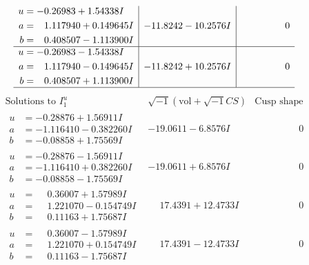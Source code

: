 \documentclass[1p]{elsarticle_modified}
\theoremstyle{definition}
\newcommand{\I}{\sqrt{-1}}
\begin{document}
$$\begin{array}{c|c|c}
\begin{aligned}
u &= -0.26983 + 1.54338 I \\
a &= \phantom{-}1.117940 + 0.149645 I \\
b &= \phantom{-}0.408507 - 1.113900 I\end{aligned}
 & -11.8242 - 10.2576 I & \phantom{-0.000000 } 0 \\ \hline\begin{aligned}
u &= -0.26983 - 1.54338 I \\
a &= \phantom{-}1.117940 - 0.149645 I \\
b &= \phantom{-}0.408507 + 1.113900 I\end{aligned}
 & -11.8242 + 10.2576 I & \phantom{-0.000000 } 0\\
 \hline 
 \end{array}$$\newpage$$\begin{array}{c|c|c}  
\text{Solutions to }I^u_{1}& \I (\text{vol} + \sqrt{-1}CS) & \text{Cusp shape}\\
 \hline 
\begin{aligned}
u &= -0.28876 + 1.56911 I \\
a &= -1.116410 - 0.382260 I \\
b &= -0.08858 + 1.75569 I\end{aligned}
 & -19.0611 - 6.8576 I & \phantom{-0.000000 } 0 \\ \hline\begin{aligned}
u &= -0.28876 - 1.56911 I \\
a &= -1.116410 + 0.382260 I \\
b &= -0.08858 - 1.75569 I\end{aligned}
 & -19.0611 + 6.8576 I & \phantom{-0.000000 } 0 \\ \hline\begin{aligned}
u &= \phantom{-}0.36007 + 1.57989 I \\
a &= \phantom{-}1.221070 - 0.154749 I \\
b &= \phantom{-}0.11163 + 1.75687 I\end{aligned}
 & \phantom{-}17.4391 + 12.4733 I & \phantom{-0.000000 } 0 \\ \hline\begin{aligned}
u &= \phantom{-}0.36007 - 1.57989 I \\
a &= \phantom{-}1.221070 + 0.154749 I \\
b &= \phantom{-}0.11163 - 1.75687 I\end{aligned}
 & \phantom{-}17.4391 - 12.4733 I & \phantom{-0.000000 } 0 \\ \hline\begin{aligned}

\end{aligned}
\end{array}$$
\end{document}
